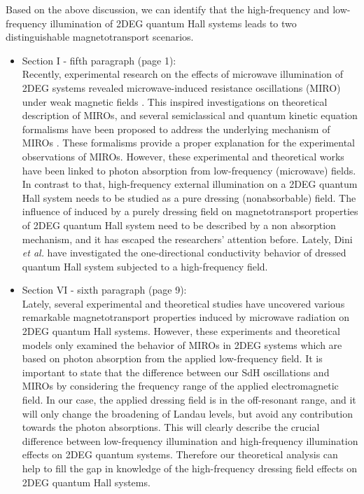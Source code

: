 \documentclass{article}
\begin{document}
Based on the above discussion, we can identify that the high-frequency and low-frequency illumination of 2DEG quantum Hall systems leads to two distinguishable magnetotransport scenarios.

\begin{itemize}
  \item Section I - fifth paragraph (page 1):\\
  {\color{Red}
  Recently, experimental research on the effects of microwave illumination of 2DEG systems revealed microwave-induced resistance oscillations (MIRO) under weak magnetic fields \cite{zudov01,mani02,zudov03,mani04}.
  This inspired investigations on theoretical description of MIROs, and several semiclassical and quantum kinetic equation formalisms have been proposed to address the underlying mechanism of MIROs \cite{durst03,dmitriev03,dmitriev05,dmitriev09}. These formalisms provide a proper explanation for the experimental observations of MIROs. However, these experimental and theoretical works have been linked to photon absorption from low-frequency (microwave) fields.
  In contrast to that, high-frequency external illumination on a 2DEG quantum Hall system needs to be studied as a pure dressing (nonabsorbable) field.
  The influence of induced by a purely dressing field on magnetotransport properties of 2DEG quantum Hall system need to be described by a non absorption mechanism, and it has escaped the researchers’ attention before.
  Lately, Dini \textit{et al.} \cite{dini16} have investigated the one-directional conductivity behavior of dressed quantum Hall system subjected to a high-frequency field.
  }
  \item Section VI - sixth paragraph (page 9):\\
  {\color{Red}
  Lately, several experimental \cite{zudov01,mani02,zudov03,mani04} and theoretical \cite{durst03,dmitriev03,dmitriev05,dmitriev09} studies have uncovered various remarkable magnetotransport properties induced by microwave radiation on 2DEG quantum Hall systems. However, these experiments and theoretical models only examined the behavior of MIROs in 2DEG systems which are based on photon absorption from the applied low-frequency field.
  It is important to state that the difference between our SdH oscillations and MIROs \cite{zudov01,mani02,zudov03,mani04} by considering the frequency range of the applied electromagnetic field. In our case, the applied dressing field is in the off-resonant range, and it will only change the broadening of Landau levels, but avoid any contribution towards the photon absorptions. This will clearly describe the crucial difference between low-frequency illumination and high-frequency illumination effects on 2DEG quantum systems. Therefore our theoretical analysis can help to fill the gap in knowledge of the high-frequency dressing field effects on 2DEG quantum Hall systems.
  }
\end{itemize}
\end{document}
